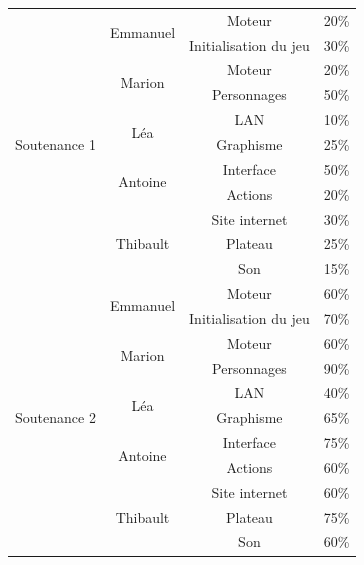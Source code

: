 \documentclass[12pt]{extarticle}
\begin{document}
\begin{table}[!ht]
	\begin{center}
		\begin{tabular}{ | c | c | c | c | }
			\hline
			\multirow{11}{*}{Soutenance 1} & \multirow{2}{*}{Emmanuel} & Moteur & 20\% \\ \cline{3-4}
			&& Initialisation du jeu & 30\% \\ \cline{2-4}
			& \multirow{2}{*}{Marion} & Moteur & 20\% \\ \cline{3-4}
			&& Personnages & 50\% \\ \cline{2-4}
			& \multirow{2}{*}{Léa} & LAN & 10\% \\ \cline{3-4}
			&& Graphisme & 25\% \\ \cline{2-4}
			& \multirow{2}{*}{Antoine} & Interface & 50\% \\ \cline{3-4}
			&& Actions & 20\% \\ \cline{2-4}
			& \multirow{3}{*}{Thibault} & Site internet & 30\% \\ \cline{3-4}
			&& Plateau & 25\% \\ \cline{3-4}
			&& Son & 15\% \\ \hline \hline

			\multirow{11}{*}{Soutenance 2} & \multirow{2}{*}{Emmanuel} & Moteur & 60\% \\ \cline{3-4}
			&& Initialisation du jeu & 70\% \\ \cline{2-4}
			& \multirow{2}{*}{Marion} & Moteur & 60\% \\ \cline{3-4}
			&& Personnages & 90\% \\ \cline{2-4}
			& \multirow{2}{*}{Léa} & LAN & 40\% \\ \cline{3-4}
			&& Graphisme & 65\% \\ \cline{2-4}
			& \multirow{2}{*}{Antoine} & Interface & 75\% \\ \cline{3-4}
			&& Actions & 60\% \\ \cline{2-4}
			& \multirow{3}{*}{Thibault} & Site internet & 60\% \\ \cline{3-4}
			&& Plateau & 75\% \\ \cline{3-4}
			&& Son & 60\% \\ \hline \hline
			

\end{tabular}
\end{center}
\end{table}
\end{document}
